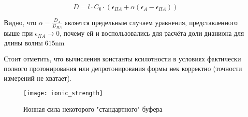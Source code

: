 \documentclass{article}
\begin{document}
	$$D=l\cdot C_0\cdot(\epsilon_{HA}+\alpha(\epsilon_{A}-\epsilon_{HA}))$$
	
	Видно, что $\alpha = \frac{D_A}{D_{HA}}$ является предельным случаем уравнения, представленного выше при $\epsilon_{HA} \rightarrow 0$, почему ей и воспользовались для расчёта доли дианиона для длины волны $615\unit{\nano\meter}$
	
	Стоит отметить, что вычисления константы ксилотности в условиях фактически полного протонирования или депротонирования формы нек корректно (точности измерений не хватает).
	\begin{figure}[h]
		\centering
		\texttt{[image: ionic\_strength]}
		\caption{Ионная сила некоторого "стандартного" буфера}
		\label{fig:ionic_strength}
	\end{figure}
	
\end{document}

